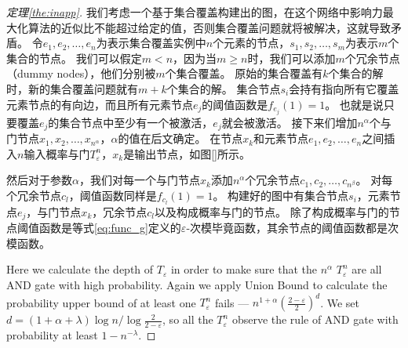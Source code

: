 \begin{proof}[定理\ref{the:inapp}]
我们考虑一个基于集合覆盖构建出的图，在这个网络中影响力最大化算法的近似比不能超过给定的值，否则集合覆盖问题就将被解决，这就导致矛盾。
令$e_1, e_2, \dots, e_n$为表示集合覆盖实例中$n$个元素的节点，$s_1, s_2, \dots, s_m$为表示$m$个集合的节点。
我们可以假定$m<n$，因为当$m\geq n$时，我们可以添加$m$个冗余节点（dummy nodes），他们分别被$m$个集合覆盖。
原始的集合覆盖有$k$个集合的解时，新的集合覆盖问题就有$m+k$个集合的解。
集合节点$s_i$会持有指向所有它覆盖元素节点的有向边，而且所有元素节点$e_j$的阈值函数是$f_{e_j}(1)=1$。
也就是说只要覆盖$e_j$的集合节点中至少有一个被激活，$e_j$就会被激活。
接下来们增加$n^\alpha$个与门节点$x_1, x_2, \dots, x_{n^\alpha}$，$\alpha$的值在后文确定。
在节点$x_k$和元素节点$e_1, e_2, \dots, e_n$之间插入$n$输入概率与门$T_\varepsilon^n$，$x_k$是输出节点，如图\ref{}所示。

然后对于参数$\alpha$，我们对每一个与门节点$x_k$添加$n^\alpha$个冗余节点$c_1, c_2, \dots, c_{n^\beta}$。
对每个冗余节点$c_l$，阈值函数同样是$f_{c_l}(1)=1$。
构建好的图中有集合节点$s_i$，元素节点$e_j$，与门节点$x_k$，冗余节点$c_l$以及构成概率与门的节点。
除了构成概率与门的节点阈值函数是等式\ref{eq:func_g}定义的$\varepsilon$-次模毕竟函数，其余节点的阈值函数都是次模函数。





Here we calculate the depth of $T_\varepsilon$ in order to make sure that the $n^\alpha$ $T_\varepsilon^n$ are all AND gate with high probability.
Again we apply Union Bound to calculate the probability upper bound of at least one $T_\varepsilon^n$ fails
--- $n^{1+\alpha}(\frac{2-\varepsilon}{2})^{d}$.
We set $d = (1+\alpha+\lambda)\log n / \log{\frac{2}{2-\varepsilon}}$,
so all the $T_\varepsilon^n$ observe the rule of AND gate with probability at least $1-n^{-\lambda}$.


\end{proof}
